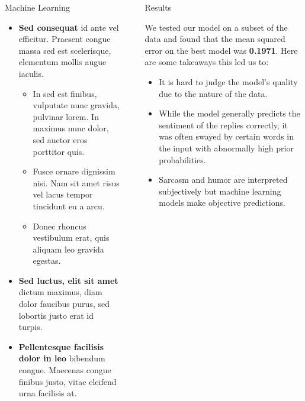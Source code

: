 \documentclass[final]{beamer}
\newlength{\sepwidth}
\newlength{\colwidth}
\newcommand{\separatorcolumn}{\begin{column}{\sepwidth}\end{column}}
\begin{document}
\begin{frame}[t]
\begin{columns}[t]
\begin{column}{\colwidth}
\begin{block}{Machine Learning}
    \begin{itemize}
      \item \textbf{Sed consequat} id ante vel efficitur. Praesent congue massa
        sed est scelerisque, elementum mollis augue iaculis.
        \begin{itemize}
          \item In sed est finibus, vulputate
            nunc gravida, pulvinar lorem. In maximus nunc dolor, sed auctor eros
            porttitor quis.
          \item Fusce ornare dignissim nisi. Nam sit amet risus vel lacus
            tempor tincidunt eu a arcu.
          \item Donec rhoncus vestibulum erat, quis aliquam leo
            gravida egestas.
        \end{itemize}
      \item \textbf{Sed luctus, elit sit amet} dictum maximus, diam dolor
        faucibus purus, sed lobortis justo erat id turpis.
      \item \textbf{Pellentesque facilisis dolor in leo} bibendum congue.
        Maecenas congue finibus justo, vitae eleifend urna facilisis at.
    \end{itemize}

  \end{block}

\end{column}

\separatorcolumn

\begin{column}{\colwidth}

  \begin{alertblock}{Results}

    We tested our model on a subset of the data and found that the mean squared error on the best model was \textbf{0.1971}. Here are some takeaways this led us to:

    \begin{itemize}
      \item It is hard to judge the model's quality due to the nature of the data.
      \item While the model generally predicts the sentiment of the replies correctly, it was often swayed by certain words in the input with abnormally high prior probabilities.
      \item Sarcasm and humor are interpreted subjectively but machine learning models make objective predictions.
    \end{itemize}


\end{alertblock}
\end{column}
\end{columns}
\end{frame}
\end{document}
